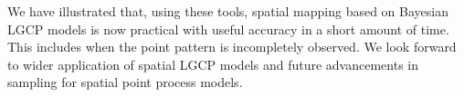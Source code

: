 \documentclass{interact}
\begin{document}
We have illustrated that, using these tools, spatial mapping based on Bayesian
LGCP models is now practical with useful accuracy in a short amount of time. This
includes when the point pattern is incompletely observed. We look forward to
wider application of spatial LGCP models and future advancements in sampling
for spatial point process models.









\end{document}
